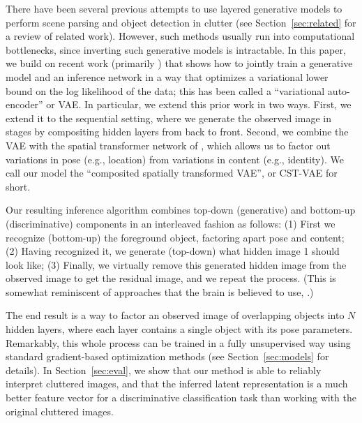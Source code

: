 There have been several previous attempts to use layered generative
models to perform scene parsing and object detection in clutter (see
Section~\ref{sec:related} for a review of related work). However, such
methods usually run into computational bottlenecks, since inverting
such generative models is intractable.
In this paper, we build on recent work (primarily \cite{Kingma2014,gregor2015draw})
that shows how to jointly train a generative model and an inference
network in a way that optimizes a variational lower bound on the log
likelihood of the data;
this has been called a ``variational auto-encoder'' or VAE.
In particular, we extend this prior work in
two ways. First, we extend it to the sequential setting, where we
generate the observed image in stages by compositing hidden layers
from back to front. 
Second, we combine the VAE with the spatial transformer network of
\citep{jaderberg2015spatial}, which allows us to factor out variations
in pose (e.g., location) from variations in content (e.g., identity).
We call our model the ``composited spatially transformed VAE'', or CST-VAE
for short.

Our resulting inference algorithm combines top-down (generative)
and bottom-up (discriminative) components in an interleaved fashion as follows:
(1)  First we recognize (bottom-up) the foreground object, factoring apart pose and content;
(2) Having recognized it, we generate (top-down) what hidden image 1 should look
like;
(3) Finally, we virtually remove this generated hidden image from the observed
image to get the residual image, and we repeat the process.
(This is somewhat reminiscent of approaches that the brain is believed
to use, \cite{Hochstein2002}.)

The end result is a way to factor an observed image of
overlapping objects into $N$
hidden layers, where each layer contains a single object
with its pose parameters.
Remarkably, this whole process can be trained in a fully unsupervised
way using standard gradient-based optimization methods
(see Section~\ref{sec:models} for details).
In Section~\ref{sec:eval}, we show that our method is able to reliably
interpret cluttered images, and that the inferred latent
representation is a much better  feature vector for a discriminative
classification task than working with the original cluttered images.




